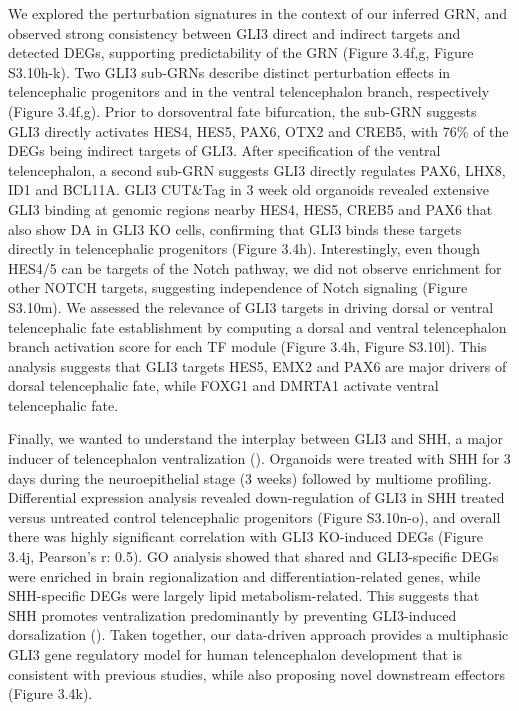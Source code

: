 We explored the perturbation signatures in the context of our inferred GRN, and observed strong consistency between GLI3 direct and indirect targets and detected DEGs, supporting predictability of the GRN (Figure 3.4f,g, Figure S3.10h-k). Two GLI3 sub-GRNs describe distinct perturbation effects in telencephalic progenitors and in the ventral telencephalon branch, respectively (Figure 3.4f,g). Prior to dorsoventral fate bifurcation, the sub-GRN suggests GLI3 directly activates HES4, HES5, PAX6, OTX2 and CREB5, with 76\% of the DEGs being indirect targets of GLI3. After specification of the ventral telencephalon, a second sub-GRN suggests GLI3 directly regulates PAX6, LHX8, ID1 and BCL11A. GLI3 CUT\&Tag in 3 week old organoids revealed extensive GLI3 binding at genomic regions nearby HES4, HES5, CREB5 and PAX6 that also show DA in GLI3 KO cells, confirming that GLI3 binds these targets directly in telencephalic progenitors (Figure 3.4h). Interestingly, even though HES4/5 can be targets of the Notch pathway, we did not observe enrichment for other NOTCH targets, suggesting independence of Notch signaling (Figure S3.10m). We assessed the relevance of GLI3 targets in driving dorsal or ventral telencephalic fate establishment by computing a dorsal and ventral telencephalon branch activation score for each TF module (Figure 3.4h, Figure S3.10l). This analysis suggests that GLI3 targets HES5, EMX2 and PAX6 are major drivers of dorsal telencephalic fate, while FOXG1 and DMRTA1 activate ventral telencephalic fate.

Finally, we wanted to understand the interplay between GLI3 and SHH, a major inducer of telencephalon ventralization (\cite{echelard_sonic_1993,ericson_sonic_1995}). Organoids were treated with SHH for 3 days during the neuroepithelial stage (3 weeks) followed by multiome profiling. Differential expression analysis revealed down-regulation of GLI3 in SHH treated versus untreated control telencephalic progenitors (Figure S3.10n-o), and overall there was highly significant correlation with GLI3 KO-induced DEGs (Figure 3.4j, Pearson's r: 0.5). GO analysis showed that shared and GLI3-specific DEGs were enriched in brain regionalization and differentiation-related genes, while SHH-specific DEGs were largely lipid metabolism-related. This suggests that SHH promotes ventralization predominantly by preventing GLI3-induced dorsalization (\cite{rallu_dorsoventral_2002,rash_patterning_2007}). Taken together, our data-driven approach provides a multiphasic GLI3 gene regulatory model for human telencephalon development that is consistent with previous studies, while also proposing novel downstream effectors (Figure 3.4k).


